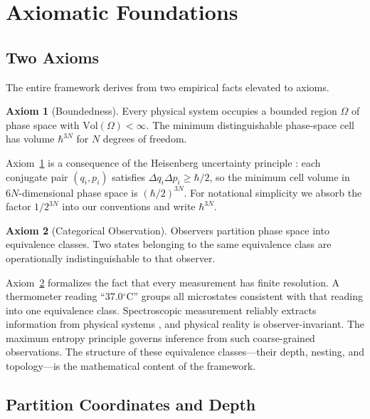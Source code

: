\documentclass[twocolumn,10pt,a4paper]{article}
\theoremstyle{definition}
\newtheorem{axiom}{Axiom}
\theoremstyle{remark}
\begin{document}
\section{Axiomatic Foundations}
\label{sec:axioms}

\subsection{Two Axioms}

The entire framework derives from two empirical facts elevated to axioms.

\begin{axiom}[Boundedness]
\label{ax:bounded}
Every physical system occupies a bounded region $\Omega$ of phase space with $\mathrm{Vol}(\Omega) < \infty$. The minimum distinguishable phase-space cell has volume $\hbar^{3N}$ for $N$ degrees of freedom.
\end{axiom}

Axiom~\ref{ax:bounded} is a consequence of the Heisenberg uncertainty principle \citep{Heisenberg1927}: each conjugate pair $(q_i, p_i)$ satisfies $\Delta q_i \Delta p_i \geq \hbar/2$, so the minimum cell volume in $6N$-dimensional phase space is $(\hbar/2)^{3N}$. For notational simplicity we absorb the factor $1/2^{3N}$ into our conventions and write $\hbar^{3N}$.

\begin{axiom}[Categorical Observation]
\label{ax:observation}
Observers partition phase space into equivalence classes. Two states belonging to the same equivalence class are operationally indistinguishable to that observer.
\end{axiom}

Axiom~\ref{ax:observation} formalizes the fact that every measurement has finite resolution. A thermometer reading ``37.0$^\circ$C'' groups all microstates consistent with that reading into one equivalence class. Spectroscopic measurement reliably extracts information from physical systems \citep{Shannon1948}, and physical reality is observer-invariant. The maximum entropy principle \citep{Jaynes1957} governs inference from such coarse-grained observations. The structure of these equivalence classes---their depth, nesting, and topology---is the mathematical content of the framework.

\subsection{Partition Coordinates and Depth}
\end{document}

